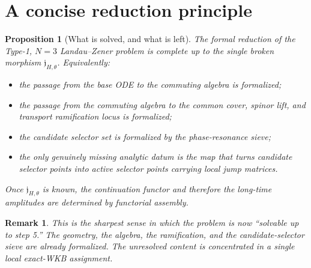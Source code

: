 \documentclass[11pt]{article}
\newtheorem{proposition}[definition]{Proposition}
\newtheorem{remark}[definition]{Remark}
\begin{document}
\section{A concise reduction principle}

\begin{proposition}[What is solved, and what is left]
The formal reduction of the Type-1, $N=3$ Landau--Zener problem is complete up to the single broken morphism $\mathfrak j_{H,\theta}$.  Equivalently:
\begin{itemize}
\item the passage from the base ODE to the commuting algebra is formalized;
\item the passage from the commuting algebra to the common cover, spinor lift, and transport ramification locus is formalized;
\item the candidate selector set is formalized by the phase-resonance sieve;
\item the only genuinely missing analytic datum is the map that turns candidate selector points into active selector points carrying local jump matrices.
\end{itemize}
Once $\mathfrak j_{H,\theta}$ is known, the continuation functor and therefore the long-time amplitudes are determined by functorial assembly.
\end{proposition}

\begin{remark}
This is the sharpest sense in which the problem is now ``solvable up to step 5.''  The geometry, the algebra, the ramification, and the candidate-selector sieve are already formalized.  The unresolved content is concentrated in a single local exact-WKB assignment.
\end{remark}
\end{document}
